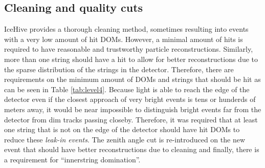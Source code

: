 \begin{table}[]
\caption{Overview of quality cuts in Level 4.}
\label{tab:level4}
\end{table}

\subsection{Cleaning and quality cuts}
\noindent IceHive provides a thorough cleaning method, sometimes resulting into events with a very low amount of hit DOMs. However, a minimal amount of hits is required to have reasonable and trustworthy particle reconstructions. Similarly, more than one string should have a hit to allow for better reconstructions due to the sparse distribution of the strings in the detector. Therefore, there are requirements on the minimum amount of DOMs and strings that should be hit as can be seen in Table \ref{tab:level4}. Because light is able to reach the edge of the detector even if the closest approach of very bright events is tens or hunderds of meters away, it would be near impossible to distinguish bright events far from the detector from dim tracks passing closeby. Therefore, it was required that at least one string that is not on the edge of the detector should have hit DOMs to reduce these \textit{leak-in events}.
The zenith angle cut is re-introduced on the new event that should have better reconstructions due to cleaning and finally, there is a requirement for ``innerstring domination''.

